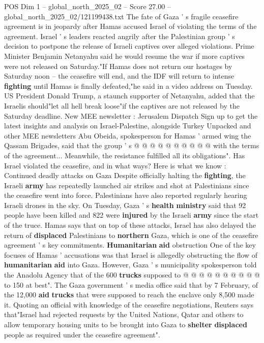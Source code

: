 \begin{textsample}{POS Dim 1 – global\_north\_2025\_02 – Score 27.00 – global\_north\_2025\_02/121199438.txt}  \label{ex:f1_pos_437}
The fate of Gaza ' s fragile ceasefire agreement is in jeopardy after Hamas accused Israel of violating the terms of the agreement.
Israel ' s leaders reacted angrily after the Palestinian group ' s decision to postpone the release of Israeli captives over alleged violations.
Prime Minister Benjamin Netanyahu said he would resume the war if more captives were not released on Saturday."If Hamas does not return our hostages by Saturday noon -- the ceasefire will end, and the IDF will return to intense \textbf{fighting} until Hamas is finally defeated,"he said in a video address on Tuesday.
US President Donald Trump, a staunch supporter of Netanyahu, added that the Israelis should"let all hell break loose"if the captives are not released by the Saturday deadline.
New MEE newsletter : Jerusalem Dispatch Sign up to get the latest insights and analysis on Israel-Palestine, alongside Turkey Unpacked and other MEE newsletters Abu Obeida, spokesperson for Hamas ' armed wing the Qassam Brigades, said that the group ' s @ @ @ @ @ @ @ @ @ @ with the terms of the agreement...
Meanwhile, the resistance fulfilled all its obligations".
Has Israel violated the ceasefire, and in what ways?
Here is what we know : Continued deadly attacks on Gaza Despite officially halting the \textbf{fighting}, the Israeli \textbf{army} has repeatedly launched air strikes and shot at Palestinians since the ceasefire went into force.
Palestinians have also reported regularly hearing Israeli drones in the sky.
On Tuesday, Gaza ' s \textbf{health} \textbf{ministry} said that 92 people have been killed and 822 were \textbf{injured} by the Israeli \textbf{army} since the start of the truce.
Hamas says that on top of these attacks, Israel has also delayed the return of \textbf{displaced} Palestinians to \textbf{northern} Gaza, which is one of the ceasefire agreement ' s key commitments. \textbf{Humanitarian} \textbf{aid} obstruction One of the key focuses of Hamas ' accusations was that Israel is allegedly obstructing the flow of \textbf{humanitarian} \textbf{aid} into Gaza.
However, Gaza ' s municipality spokesperson told the Anadolu Agency that of the 600 \textbf{trucks} supposed to @ @ @ @ @ @ @ @ @ @ to 150 at best".
The Gaza government ' s media office said that by 7 February, of the 12,000 \textbf{aid} \textbf{trucks} that were supposed to reach the enclave only 8,500 made it.
Quoting an official with knowledge of the ceasefire negotiations, Reuters says that"Israel had rejected requests by the United Nations, Qatar and others to allow temporary housing units to be brought into Gaza to \textbf{shelter} \textbf{displaced} people as required under the ceasefire agreement".

\end{textsample}
